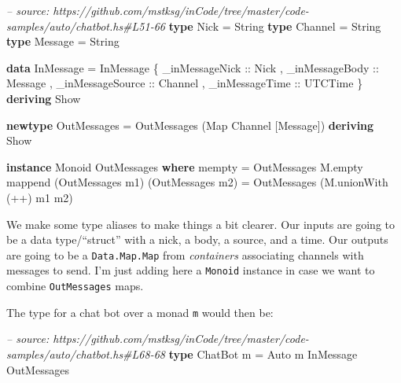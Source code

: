 \documentclass[]{article}
\newenvironment{Shaded}{\begin{snugshade}}{\end{snugshade}}
\newcommand{\CommentTok}[1]{\textcolor[rgb]{0.56,0.35,0.01}{\textit{#1}}}
\newcommand{\DataTypeTok}[1]{\textcolor[rgb]{0.13,0.29,0.53}{#1}}
\newcommand{\FunctionTok}[1]{\textcolor[rgb]{0.00,0.00,0.00}{#1}}
\newcommand{\KeywordTok}[1]{\textcolor[rgb]{0.13,0.29,0.53}{\textbf{#1}}}
\newcommand{\NormalTok}[1]{#1}
\newcommand{\OtherTok}[1]{\textcolor[rgb]{0.56,0.35,0.01}{#1}}
\begin{document}
\begin{Shaded}
\begin{Highlighting}[]
\CommentTok{-- source: https://github.com/mstksg/inCode/tree/master/code-samples/auto/chatbot.hs#L51-66}
\KeywordTok{type} \DataTypeTok{Nick}    \FunctionTok{=} \DataTypeTok{String}
\KeywordTok{type} \DataTypeTok{Channel} \FunctionTok{=} \DataTypeTok{String}
\KeywordTok{type} \DataTypeTok{Message} \FunctionTok{=} \DataTypeTok{String}

\KeywordTok{data} \DataTypeTok{InMessage} \FunctionTok{=} \DataTypeTok{InMessage}\NormalTok{ \{}\OtherTok{ _inMessageNick   ::} \DataTypeTok{Nick}
\NormalTok{                           ,}\OtherTok{ _inMessageBody   ::} \DataTypeTok{Message}
\NormalTok{                           ,}\OtherTok{ _inMessageSource ::} \DataTypeTok{Channel}
\NormalTok{                           ,}\OtherTok{ _inMessageTime   ::} \DataTypeTok{UTCTime}
\NormalTok{                           \} }\KeywordTok{deriving} \DataTypeTok{Show}

\KeywordTok{newtype} \DataTypeTok{OutMessages} \FunctionTok{=} \DataTypeTok{OutMessages}\NormalTok{ (}\DataTypeTok{Map} \DataTypeTok{Channel}\NormalTok{ [}\DataTypeTok{Message}\NormalTok{]) }\KeywordTok{deriving} \DataTypeTok{Show}

\KeywordTok{instance} \DataTypeTok{Monoid} \DataTypeTok{OutMessages} \KeywordTok{where}
\NormalTok{    mempty  }\FunctionTok{=} \DataTypeTok{OutMessages}\NormalTok{ M.empty}
\NormalTok{    mappend (}\DataTypeTok{OutMessages}\NormalTok{ m1) (}\DataTypeTok{OutMessages}\NormalTok{ m2)}
            \FunctionTok{=} \DataTypeTok{OutMessages}\NormalTok{ (M.unionWith (}\FunctionTok{++}\NormalTok{) m1 m2)}
\end{Highlighting}
\end{Shaded}

We make some type aliases to make things a bit clearer. Our inputs are going to
be a data type/``struct'' with a nick, a body, a source, and a time. Our outputs
are going to be a \texttt{Data.Map.Map} from \emph{containers} associating
channels with messages to send. I'm just adding here a \texttt{Monoid} instance
in case we want to combine \texttt{OutMessages} maps.

The type for a chat bot over a monad \texttt{m} would then be:

\begin{Shaded}
\begin{Highlighting}[]
\CommentTok{-- source: https://github.com/mstksg/inCode/tree/master/code-samples/auto/chatbot.hs#L68-68}
\KeywordTok{type} \DataTypeTok{ChatBot}\NormalTok{ m }\FunctionTok{=} \DataTypeTok{Auto}\NormalTok{ m }\DataTypeTok{InMessage} \DataTypeTok{OutMessages}
\end{Highlighting}
\end{Shaded}
\end{document}

